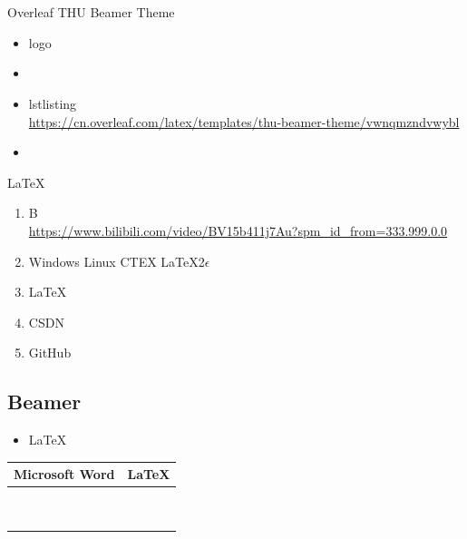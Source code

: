 \documentclass{article}
\begin{document}
	\section{ }
	    \subsection{ }
	
	\begin{frame}{ Overleaf THU Beamer Theme }
		\begin{itemize}[<+->]
			\item  logo
			\item  
			\item  lstlisting  \\
			\url{https://cn.overleaf.com/latex/templates/thu-beamer-theme/vwnqmzndvwybl}
			\item  
		\end{itemize}
	\end{frame}
		
	\begin{frame}{ \LaTeX{}  }
		\begin{enumerate}[<+->]
			\item  B  \\ \url{https://www.bilibili.com/video/BV15b411j7Au?spm_id_from=333.999.0.0}
			\item   Windows  Linux  CTEX LaTeX2$\epsilon$ 
			\item  \LaTeX{}   
			\item  CSDN
			\item  GitHub
		\end{enumerate}
	\end{frame}
	
	\subsection{ Beamer}
	
	\begin{frame}
    	\begin{itemize}
    	    \item \LaTeX{}  
    	\end{itemize}
        \begin{table}[h]
    		\centering
    		\begin{tabular}{c|c}
    			Microsoft Word & \LaTeX{} \\
    			\hline
    			  &   \\
    			  &   \\
    			  &   \\
    			  &   \\
    			  &   \\
    			  &   \\
    			  &   \\
    			  &   \\
    			  &   \\
    		\end{tabular}
    	\end{table}
    \end{frame}
	
\end{document}
